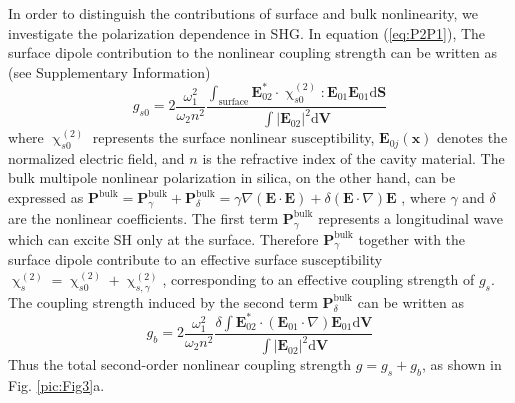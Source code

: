 \documentclass[a4paper,8pt,hyperref, twocolumn, aps, prl]{article}
\begin{document}
In order to distinguish the contributions of surface and bulk nonlinearity, we investigate the polarization dependence in SHG.
In equation (\ref{eq:P2P1}), The surface dipole contribution to the nonlinear coupling strength can be written as (see Supplementary Information)
\begin{equation}
g_{s0} = 2\frac{\omega_1^2}{\omega_2n^2}\frac{\int_{\mathrm{surface} } \mathbf{E}_{02}^* \cdot \upchi^{(2)}_{s0}:\mathbf{E}_{01}\mathbf{E}_{01} \mathrm{d}	\mathbf{S}}{\int |\mathbf{E}_{02}|^2 \mathrm{d}	\mathbf{V}}
\end{equation}
where $\upchi^{(2)}_{s0}$ represents the surface nonlinear susceptibility, $\mathbf{E}_{0j}(\mathbf{x})$ denotes the  normalized electric field, and $n$ is the refractive index of the cavity material.
The bulk multipole nonlinear polarization in silica, on the other hand, can be expressed as $\mathbf{P}^{\mathrm{bulk}} = \mathbf{P}^{\mathrm{bulk}}_\gamma + \mathbf{P}^{\mathrm{bulk}}_\delta = \gamma\nabla(\mathbf{E}\cdot\mathbf{E})+\delta(\mathbf{E}\cdot\nabla)\mathbf{E}$ \cite{bloembergen1968optical}, where $\gamma$ and $\delta$ are the nonlinear coefficients. The first term $\mathbf{P}^{\mathrm{bulk}}_\gamma$ represents a longitudinal wave which can excite SH only at the surface. Therefore $\mathbf{P}^{\mathrm{bulk}}_\gamma$ together with the surface dipole contribute to an effective surface susceptibility \cite{heinz1991second} $\upchi^{(2)}_s = \upchi^{(2)}_{s0}+\upchi^{(2)}_{s,\gamma}$, corresponding to an effective coupling strength of $g_s$. The coupling strength induced by the second term $\mathbf{P}^{\mathrm{bulk}}_\delta$ can be written as
\begin{equation}
g_b =  2\frac{\omega_1^2}{\omega_2n^2}\frac{\delta \int \mathbf{E}_{02}^* \cdot (\mathbf{E}_{01}\cdot\nabla)\mathbf{E}_{01} \mathrm{d}	\mathbf{V}}{\int |\mathbf{E}_{02}|^2 \mathrm{d} \mathbf{V}}
\label{eq:gb}
\end{equation}
Thus the total second-order nonlinear coupling strength $g = g_s+g_b$, as shown in Fig. \ref{pic:Fig3}a.
\end{document}

